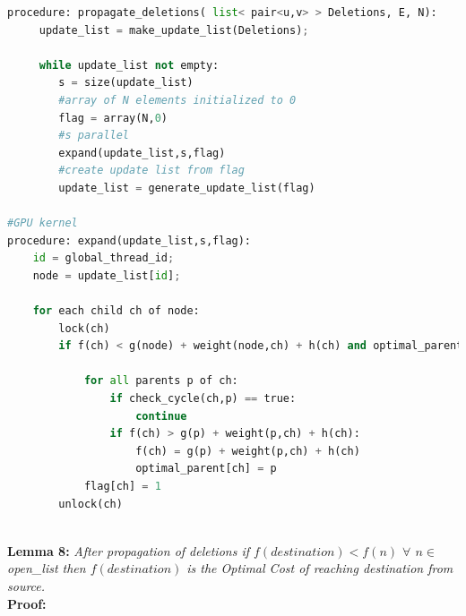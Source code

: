 \documentclass[a4paper]{article}
\begin{document}
\begin{lstlisting}[language=python, caption=Propagation of Deletions]
procedure: propagate_deletions( list< pair<u,v> > Deletions, E, N):
     update_list = make_update_list(Deletions);
     
     while update_list not empty:
        s = size(update_list)
        #array of N elements initialized to 0
        flag = array(N,0)
        #s parallel
        expand(update_list,s,flag)
        #create update list from flag
        update_list = generate_update_list(flag)

#GPU kernel
procedure: expand(update_list,s,flag):
    id = global_thread_id;
    node = update_list[id];
    
    for each child ch of node:
        lock(ch)
        if f(ch) < g(node) + weight(node,ch) + h(ch) and optimal_parent[ch] == node:
            
            for all parents p of ch:
                if check_cycle(ch,p) == true:
                    continue
                if f(ch) > g(p) + weight(p,ch) + h(ch):
                    f(ch) = g(p) + weight(p,ch) + h(ch)
                    optimal_parent[ch] = p
            flag[ch] = 1
        unlock(ch)
        
\end{lstlisting}

\textbf{Lemma 8:} \textit{After propagation of deletions if $f(destination) < f(n)$ $ \forall$ $n \in $open\_list then $f(destination)$ is the Optimal Cost of reaching destination from source.}\\
\textbf{Proof:}



\end{document}

